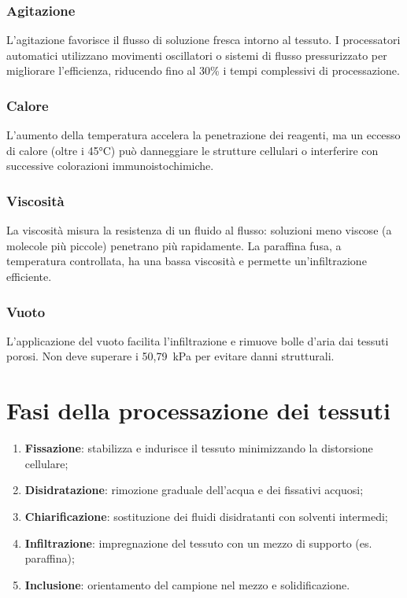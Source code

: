 \subsubsection{Agitazione}
L’agitazione favorisce il flusso di soluzione fresca intorno al tessuto. I processatori automatici utilizzano movimenti oscillatori o sistemi di flusso pressurizzato per migliorare l’efficienza, riducendo fino al 30\% i tempi complessivi di processazione.

\subsubsection{Calore}
L’aumento della temperatura accelera la penetrazione dei reagenti, ma un eccesso di calore (oltre i 45°C) può danneggiare le strutture cellulari o interferire con successive colorazioni immunoistochimiche.

\subsubsection{Viscosità}
La viscosità misura la resistenza di un fluido al flusso: soluzioni meno viscose (a molecole più piccole) penetrano più rapidamente. La paraffina fusa, a temperatura controllata, ha una bassa viscosità e permette un’infiltrazione efficiente.

\subsubsection{Vuoto}
L’applicazione del vuoto facilita l’infiltrazione e rimuove bolle d’aria dai tessuti porosi. Non deve superare i 50,79~kPa per evitare danni strutturali.



\section{Fasi della processazione dei tessuti}
\begin{enumerate}
    \item \textbf{Fissazione}: stabilizza e indurisce il tessuto minimizzando la distorsione cellulare;
    \item \textbf{Disidratazione}: rimozione graduale dell’acqua e dei fissativi acquosi;
    \item \textbf{Chiarificazione}: sostituzione dei fluidi disidratanti con solventi intermedi;
    \item \textbf{Infiltrazione}: impregnazione del tessuto con un mezzo di supporto (es. paraffina);
    \item \textbf{Inclusione}: orientamento del campione nel mezzo e solidificazione.
\end{enumerate}

